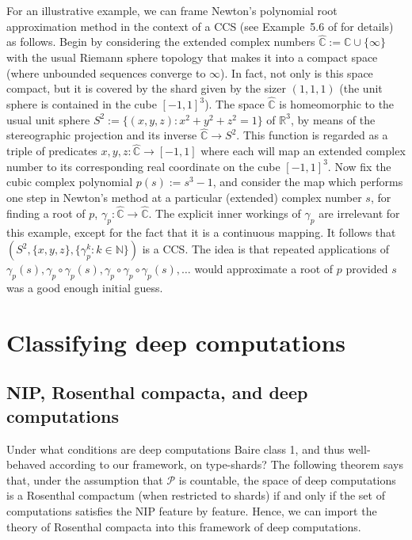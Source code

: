 \documentclass[psamsfonts]{amsart}
\theoremstyle{definition}
\theoremstyle{remark}
\numberwithin{equation}{section}
\begin{document}
For an illustrative example, we can frame Newton's polynomial root approximation method in the context of a CCS (see Example~5.6 of \cite{alva2024approximability} for details) as follows.
Begin by considering the extended complex numbers $\hat{\mathbb{C}}:=\mathbb{C}\cup\{\infty\}$ with the usual Riemann sphere topology that makes it into a compact space (where unbounded sequences converge to $\infty$).
In fact, not only is this space compact, but it is covered by the shard given by the sizer $(1,1,1)$ (the unit sphere is contained in the cube $[-1,1]^3$).
The space $\hat{\mathbb{C}}$ is homeomorphic to the usual unit sphere $S^2:=\{(x,y,z):x^2+y^2+z^2=1\}$ of $\mathbb{R}^3$, by means of the stereographic projection and its inverse $\hat{\mathbb{C}}\to S^2$.
This function is regarded as a triple of predicates $x,y,z:\hat{\mathbb{C}}\to[-1,1]$ where each will map an extended complex number to its corresponding real coordinate on the cube $[-1,1]^3$.
Now fix the cubic complex polynomial $p(s):=s^3-1$, and consider the map which performs one step in Newton's method at a particular (extended) complex number $s$, for finding a root of $p$, $\gamma_p:\hat{\mathbb{C}}\to\hat{\mathbb{C}}$.
The explicit inner workings of $\gamma_p$ are irrelevant for this example, except for the fact that it is a continuous mapping.
It follows that $(S^2,\{x,y,z\},\{\gamma_p^k:k\in\mathbb{N}\})$ is a CCS.
The idea is that repeated applications of $\gamma_p(s), \gamma_p\circ\gamma_p(s), \gamma_p\circ\gamma_p\circ\gamma_p(s),\dots$ would approximate a root of $p$ provided $s$ was a good enough initial guess.








\section{Classifying deep computations}
\label{S:Classification}

\subsection{NIP, Rosenthal compacta, and deep computations}

Under what conditions are deep computations Baire class 1, and thus well-behaved according to our framework, on type-shards? The following theorem says that, under the assumption that $\mathcal{P}$ is countable, the space of deep computations is a Rosenthal compactum (when restricted to shards) if and only if the set of computations satisfies the NIP feature by feature.
Hence, we can import the theory of Rosenthal compacta into this framework of deep computations.
\end{document}
